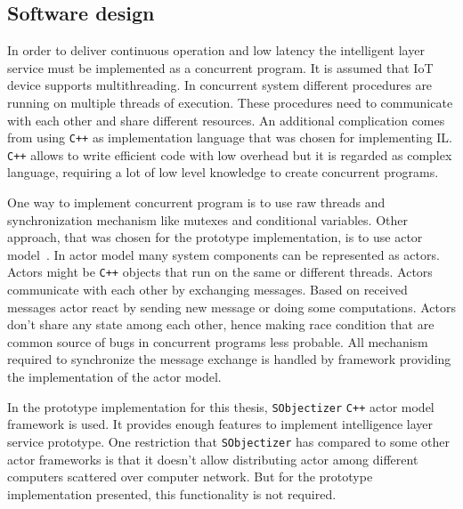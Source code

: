 \documentclass[english, 12pt, a4paper, elec, utf8, online]{aaltothesis}
\begin{document}
\subsection{Software design}
In order to deliver continuous operation and low latency the intelligent layer service must be implemented as a concurrent program. It is assumed that IoT device supports multithreading. In concurrent system different procedures are running on multiple threads of execution. These procedures need to communicate with each other and share different resources. An additional complication comes from using \texttt{C++} as implementation language that was chosen for implementing IL. \texttt{C++} allows to write efficient code with low overhead but it is regarded as complex language, requiring a lot of low level knowledge to create concurrent programs. 

One way to implement concurrent program is to use raw threads and synchronization mechanism like mutexes and conditional variables. Other approach, that was chosen for the prototype implementation, is to use actor model~\cite{agha1985actors}. In actor model many system components can be represented as actors. Actors might be \texttt{C++} objects that run on the same or different threads. Actors communicate with each other by exchanging messages. Based on received messages actor react by sending new message or doing some computations. Actors don't share any state among each other, hence making race condition that are common source of bugs in concurrent programs less probable. All mechanism required to synchronize the message exchange is handled by framework providing the implementation of the actor model.        
  
In the prototype implementation for this thesis, \texttt{SObjectizer} \texttt{C++} actor model framework is used. It provides enough features to implement intelligence layer service prototype. One restriction that \texttt{SObjectizer} has compared to some other actor frameworks is that it doesn't allow distributing actor among different computers scattered over computer network. But for the prototype implementation presented, this functionality is not required.      
     
\end{document}
